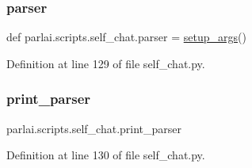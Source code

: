 \subsubsection{\texorpdfstring{parser}{parser}}
{\footnotesize\ttfamily def parlai.\+scripts.\+self\+\_\+chat.\+parser = \hyperlink{namespaceparlai_1_1scripts_1_1self__chat_a0899a6bf4e3d48c81a2c1b97f9696714}{setup\+\_\+args}()}



Definition at line 129 of file self\+\_\+chat.\+py.

\mbox{\label{namespaceparlai_1_1scripts_1_1self__chat_a41f7dd601db93d7b7f5edfa0da0ab336}} 
\subsubsection{\texorpdfstring{print\+\_\+parser}{print\_parser}}
{\footnotesize\ttfamily parlai.\+scripts.\+self\+\_\+chat.\+print\+\_\+parser}



Definition at line 130 of file self\+\_\+chat.\+py.

